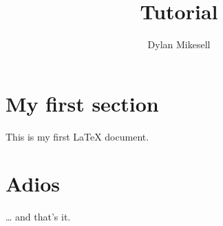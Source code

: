 \documentclass{article}
\author{Dylan Mikesell}
\title{\latex Tutorial}
\newcommand{\latex}{\LaTeX\xspace}
\begin{document}
\maketitle
\tableofcontents
\section{My first section}
This is my first \latex document.
\section{Adios}
\ldots{} and that's it.
\end{document}
